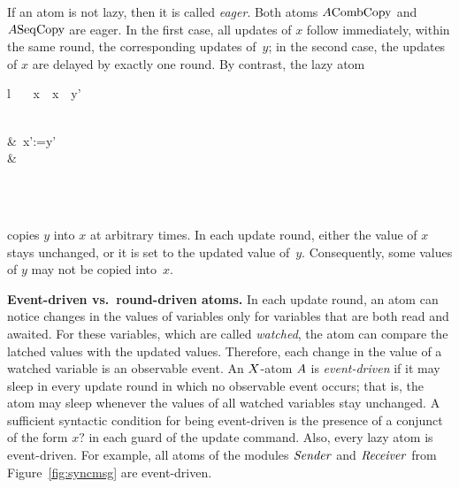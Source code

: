\mypar
If an atom is not lazy, then it is called {\em eager}.
Both atoms $A{\rm Comb\-Copy}$ and $A{\rm Seq\-Copy}$ are eager.
In the first case, all updates of $x$ follow immediately, within the same
round, the corresponding updates of~$y$;
in the second case, the updates of $x$ are delayed by exactly one round.
By contrast, the lazy atom
\begin{mtab}{l}
  \qu \ATOM\   \LCopy\ \CONTROLS\ x\ \READS\ x\ \AWAITS\ y'\\
  \qqu \INIT\ \UPDATE\\
  \qqu \begin{chtab}
    \true &\ x':=y'\\
    \true &
  \end{chtab} \\
  \qu \ENDA \\
\end{mtab}
copies $y$ into $x$ at arbitrary times.
In each update round, either the value of $x$ stays unchanged, or it is set
to the updated value of~$y$.
Consequently, some values of $y$ may not be copied into~$x$.

\mypar
{\bf Event-driven vs.\ round-driven atoms. }
In each update round, an atom can notice changes in the values of variables
only for variables that are both read and awaited.
For these variables, which are called {\em watched}, the atom can compare the
latched values with the updated values.
Therefore, each change in the value of a watched variable is an observable
event.
An $X$-atom $A$ is {\em event-driven\/} if it may sleep in every
update round in which no observable event occurs;
that is, the atom may sleep whenever the values of all watched variables stay
unchanged.
A sufficient syntactic condition for being event-driven is the presence of a
conjunct of the form $x?$ in each guard of the update command.
Also, every lazy atom is event-driven.
For example, all atoms of the modules ${\it Sender\/}$ and ${\it Receiver\/}$ from
Figure~\ref{fig:syncmsg} are event-driven.

